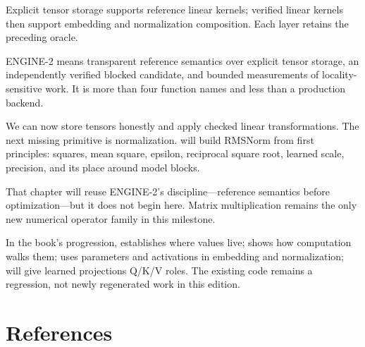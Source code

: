 Explicit tensor storage supports reference linear kernels; verified linear kernels then support embedding and normalization composition. Each layer retains the preceding oracle.

ENGINE-2 means transparent reference semantics over explicit tensor
storage, an independently verified blocked candidate, and bounded
measurements of locality-sensitive work. It is more than four function
names and less than a production backend.

We can now store tensors honestly and apply checked linear
transformations. The next missing primitive is normalization. 
will build RMSNorm from first principles: squares, mean square, epsilon,
reciprocal square root, learned scale, precision, and its place around
model blocks.

That chapter will reuse ENGINE-2's discipline---reference semantics
before optimization---but it does not begin here. Matrix multiplication
remains the only new numerical operator family in this milestone.

In the book's progression,  establishes where values live;
 shows how computation walks them;  uses parameters
and activations in embedding and normalization;  will give
learned projections Q/K/V roles. The existing  code remains a
regression, not newly regenerated work in this edition.

\section{References}\label{references-3}

